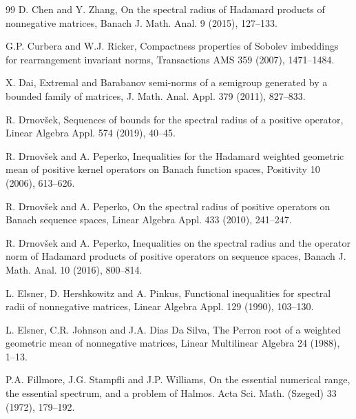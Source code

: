 \documentclass[12pt, reqno]{amsart}
\theoremstyle{definition}
\theoremstyle{remark}
\numberwithin{equation}{section}
\begin{document}
\begin{thebibliography}{99}
 D. Chen and Y. Zhang,  On the spectral radius of Hadamard products of nonnegative matrices, Banach J. Math. Anal.  9 (2015), 127--133. %


 G.P. Curbera and W.J. Ricker, Compactness properties of Sobolev imbeddings for rearrangement invariant norms,
 Transactions AMS 359  (2007),  1471--1484.


 X. Dai, Extremal and Barabanov semi-norms of a semigroup generated by
a bounded family of matrices, J. Math. Anal. Appl. 379 (2011), 827--833.


 R. Drnov\v sek,  Sequences of bounds for the spectral radius of a positive operator, Linear Algebra Appl. 574 (2019), 40--45.

 R. Drnov\v sek and A. Peperko,  Inequalities for the Hadamard
        weighted geometric mean of positive kernel operators on Banach function spaces,
         Positivity 10 (2006), 613--626.

 R. Drnov\v sek and A. Peperko,  On the spectral radius of positive operators on Banach
sequence spaces,  Linear Algebra Appl.  433 (2010), 241--247.

 R. Drnov\v sek and A. Peperko, Inequalities on the spectral radius and the operator norm of Hadamard products of positive operators on sequence spaces, Banach J. Math. Anal. 10 (2016), 800--814.




 L. Elsner, D. Hershkowitz and A. Pinkus,  Functional inequalities
        for spectral radii of nonnegative matrices, Linear Algebra Appl. 129 (1990), 103--130.

 L. Elsner, C.R. Johnson and J.A. Dias Da Silva,
  	The Perron root of a weighted geometric mean of nonnegative matrices,
	Linear Multilinear Algebra 24 (1988), 1--13.

P.A. Fillmore, J.G. Stampfli and J.P. Williams,  On the essential numerical range, the essential spectrum, and a problem of Halmos. Acta Sci. Math. (Szeged) 33 (1972), 179--192.



\end{thebibliography}
\end{document}
